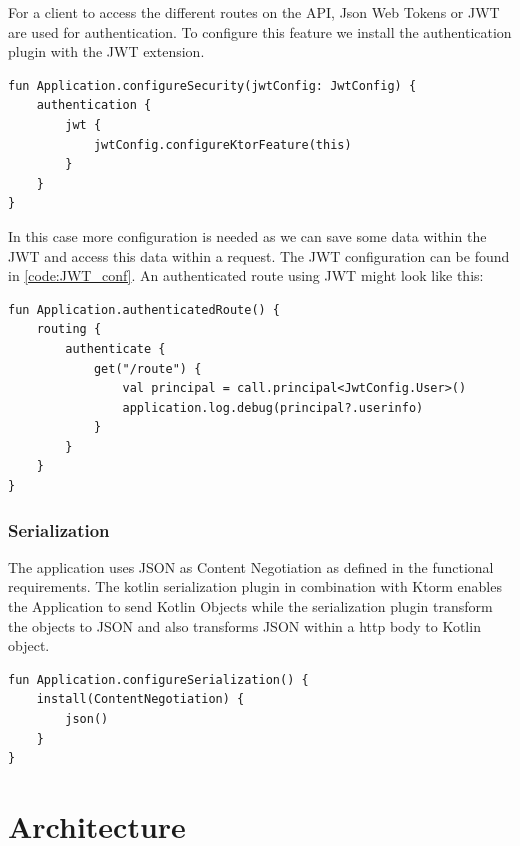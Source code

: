 For a client to access the different routes on the API, Json Web Tokens or JWT are used for authentication. To configure this feature we install the authentication plugin with the JWT extension.

\begin{verbatim}
fun Application.configureSecurity(jwtConfig: JwtConfig) {
    authentication {
        jwt {
            jwtConfig.configureKtorFeature(this)
        }
    }
}
\end{verbatim}

In this case more configuration is needed as we can save some data within the JWT and access this data within a request. The JWT configuration can be found in \ref{code:JWT_conf}. An authenticated route using JWT might look like this:

\begin{verbatim}
fun Application.authenticatedRoute() {
    routing {
        authenticate {
            get("/route") {
                val principal = call.principal<JwtConfig.User>()
                application.log.debug(principal?.userinfo)
            }
        }
    }
}
\end{verbatim}

\subsubsection{Serialization}

The application uses JSON as Content Negotiation as defined in the functional requirements. The kotlin serialization plugin in combination with Ktorm enables the Application to send Kotlin Objects while the serialization plugin transform the objects to JSON and also transforms JSON within a http body to Kotlin object. 

\begin{verbatim}
fun Application.configureSerialization() {
    install(ContentNegotiation) {
        json()
    }
}
\end{verbatim}

\section{Architecture}

\label{sec:architecture}

